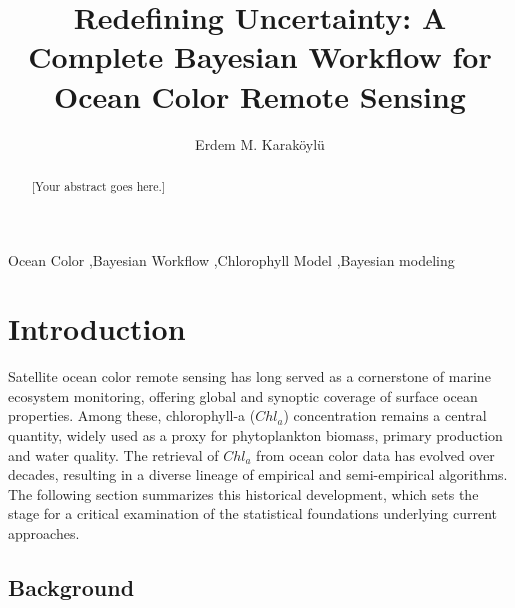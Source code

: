\documentclass[preprint,authoryear]{elsarticle}
\begin{document}
\begin{frontmatter}

\title{Redefining Uncertainty: A Complete Bayesian Workflow for Ocean Color Remote Sensing}

\author[inst1]{Erdem M. Karaköylü}



\begin{abstract}
[Your abstract goes here.]
\end{abstract}

\begin{keyword}
Ocean Color \sep Bayesian Workflow \sep Chlorophyll Model \sep Bayesian modeling 
\end{keyword}

\end{frontmatter}


\section{Introduction}

Satellite ocean color remote sensing has long served as a cornerstone of marine ecosystem monitoring, offering global and synoptic coverage of surface ocean properties. Among these, chlorophyll-a ($Chl_a$) concentration remains a central quantity, widely used as a proxy for phytoplankton biomass, primary production and water quality. The retrieval of $Chl_a$ from ocean color data has evolved over decades, resulting in a diverse lineage of empirical and semi-empirical algorithms. The following section summarizes this historical development, which sets the stage for a critical examination of the statistical foundations underlying current approaches.


\subsection{Background} 
\end{document}
